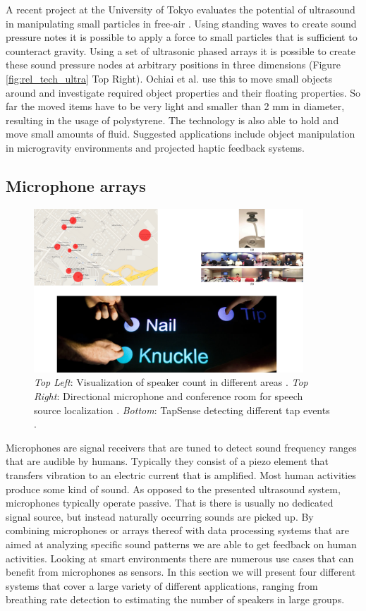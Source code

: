 A recent project at the University of Tokyo evaluates the potential of ultrasound in manipulating small particles in free-air \cite{ochiai2013three}. Using standing waves to  create sound pressure notes it is possible to apply a force to small particles that is sufficient to counteract gravity. Using a set of ultrasonic phased arrays it is possible to create these sound pressure nodes at arbitrary positions in three dimensions (Figure \ref{fig:rel_tech_ultra} Top Right). Ochiai et al. use this to move small objects around and investigate required object properties and their floating properties. So far the moved items have to be very light and smaller than 2 mm in diameter, resulting in the usage of polystyrene. The technology is also able to hold and move small amounts of fluid. Suggested applications include object manipulation in microgravity environments and projected haptic feedback systems.

\subsection{Microphone arrays}
\begin{figure}[h]
\centering
\includegraphics[width=0.9\textwidth]{images/rel_tech_mic}
\caption{\emph{Top Left}: Visualization of speaker count in different areas \cite{xu2013crowd++}. \emph{Top Right}: Directional microphone and conference room for speech source localization \cite{zhang2008maximum}. \emph{Bottom}: TapSense detecting different tap events \cite{harrison2011tapsense}.}
\label{fig:rel_tech_mic}
\end{figure}
Microphones are signal receivers that are tuned to detect sound frequency ranges that are audible by humans. Typically they consist of a piezo element that transfers vibration to an electric current that is amplified. Most human activities produce some kind of sound. As opposed to the presented ultrasound system, microphones typically operate passive. That is there is usually no dedicated signal source, but instead naturally occurring sounds are picked up. By combining microphones or arrays thereof with data processing systems that are aimed at analyzing specific sound patterns we are able to get feedback on human activities. Looking at smart environments there are numerous use cases that can benefit from microphones as sensors. In this section we will present four different systems that cover a large variety of different applications, ranging from breathing rate detection to estimating the number of speakers in large groups.

